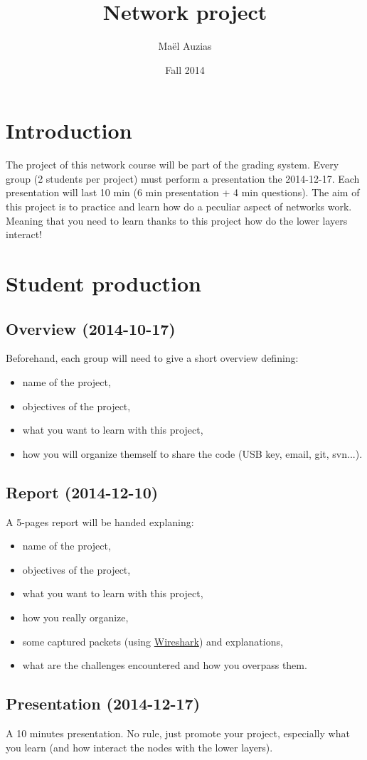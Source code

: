 \documentclass[11pt]{article}
\begin{document}
 
\title{Network project}
\date{Fall 2014}
\author{Maël Auzias}
\maketitle

\section{Introduction}
The project of this network course will be part of the grading system. Every group (2 students per project) must perform a presentation the 2014-12-17. Each presentation will last 10 min (6 min presentation + 4 min questions).
The aim of this project is to practice and learn how do a peculiar aspect of networks work. Meaning that you need to learn thanks to this project how do the lower layers interact!

\section{Student production}
\subsection{Overview (2014-10-17)}
Beforehand, each group will need to give a short overview defining:
  \begin{itemize}
    \item name of the project,
    \item objectives of the project,
    \item what you want to learn with this project,
    \item how you will organize themself to share the code (USB key, email, git, svn...).
  \end{itemize}
\subsection{Report (2014-12-10)}
A 5-pages report will be handed explaning:
  \begin{itemize}
    \item name of the project,
    \item objectives of the project,
    \item what you want to learn with this project,
    \item how you really organize,
    \item some captured packets (using \color{blue}\href{https://www.wireshark.org/}{Wireshark}\color{black}) and explanations,
    \item what are the challenges encountered and how you overpass them.
  \end{itemize}
\subsection{Presentation (2014-12-17)}
A 10 minutes presentation. No rule, just promote your project, especially what you learn (and how interact the nodes with the lower layers).
\end{document}
